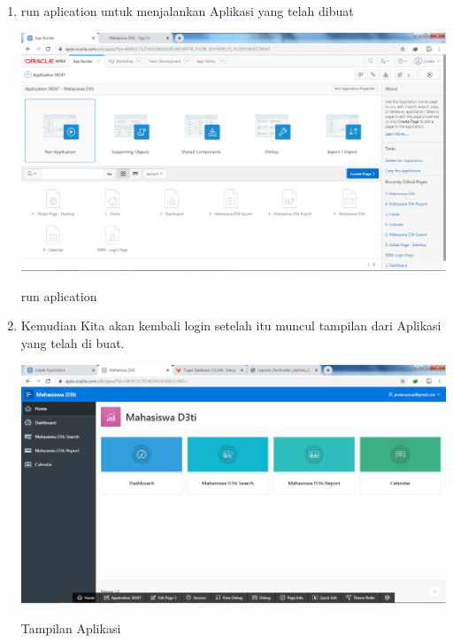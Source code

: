 \documentclass{article}
\begin{document}
\begin{enumerate}
    \item run aplication untuk menjalankan Aplikasi yang telah dibuat
    \begin{center}
         \centering
            \includegraphics[scale=0.27]{figures/DB6.png}
        \caption{run aplication}
        \label{excel}
    \end{center}
    
    \item Kemudian Kita akan kembali login setelah itu muncul tampilan dari Aplikasi yang telah di buat. 
     
    \begin{center}
         \centering
            \includegraphics[scale=0.27]{figures/DB9.png}
        \caption{Tampilan Aplikasi}
        \label{excel}
    \end{center}
        

\end{enumerate}
\end{document}
